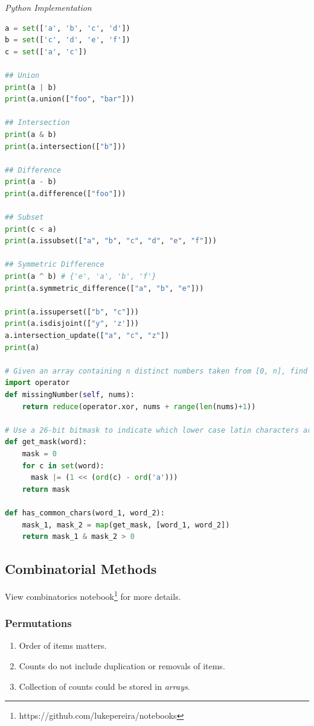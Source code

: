 \documentclass{article}
\begin{document}
    

\vspace{8pt} \emph{Python Implementation}
\begin{lstlisting}[language=Python]
a = set(['a', 'b', 'c', 'd'])
b = set(['c', 'd', 'e', 'f'])
c = set(['a', 'c'])

## Union
print(a | b)
print(a.union(["foo", "bar"]))

## Intersection
print(a & b)
print(a.intersection(["b"]))

## Difference
print(a - b)
print(a.difference(["foo"]))

## Subset
print(c < a)
print(a.issubset(["a", "b", "c", "d", "e", "f"]))

## Symmetric Difference
print(a ^ b) # {'e', 'a', 'b', 'f'}
print(a.symmetric_difference(["a", "b", "e"]))

print(a.issuperset(["b", "c"]))
print(a.isdisjoint(["y", 'z']))
a.intersection_update(["a", "c", "z"])
print(a)

# Given an array containing n distinct numbers taken from [0, n], find the one that is missing from the array.
import operator
def missingNumber(self, nums):
    return reduce(operator.xor, nums + range(len(nums)+1))

# Use a 26-bit bitmask to indicate which lower case latin characters are inside the string.
def get_mask(word):
    mask = 0
    for c in set(word):
      mask |= (1 << (ord(c) - ord('a')))
    return mask
    
def has_common_chars(word_1, word_2):
    mask_1, mask_2 = map(get_mask, [word_1, word_2])
    return mask_1 & mask_2 > 0
\end{lstlisting}    

\subsection{Combinatorial Methods}

    View combinatorics notebook\footnote{https://github.com/lukepereira/notebooks} for more details.

    \subsubsection{Permutations}
    \begin{enumerate}
        \item Order of items matters.
        \item Counts do not include duplication or removals of items.
        \item Collection of counts could be stored in \emph{arrays}. 
    \end{enumerate} 
    
\end{document}
